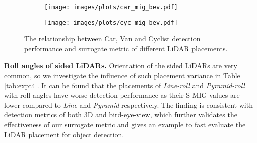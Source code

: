 \documentclass[10pt,twocolumn,letterpaper]{article}
\begin{document}
\begin{figure*}[t]
    \begin{subfigure}[b]{0.45\textwidth}
  \texttt{[image: images/plots/car\_mig\_bev.pdf]}
    \end{subfigure}%
    \begin{subfigure}[b]{0.45\textwidth}
  \texttt{[image: images/plots/cyc\_mig\_bev.pdf]}
    \end{subfigure}%
    \vspace*{-3mm}
  \caption{The relationship between Car, Van and Cyclist detection performance  and surrogate metric of different LiDAR placements.}
  \label{fig:expt2}
   \vspace*{-5mm}
\end{figure*}

\textbf{Roll angles of sided LiDARs.} Orientation of the sided LiDARs are very common, so we investigate the influence of such placement variance in Table \ref{tab:expt4}.  It can be found that the placements of \textit{Line-roll} and \textit{Pyramid-roll} with roll angles  have worse detection performance as their S-MIG values are lower compared to \textit{Line}  and  \textit{Pyramid} respectively. The finding is consistent with detection metrics of both 3D and bird-eye-view, which further validates the effectiveness of our surrogate  metric and gives an example to fast evaluate the LiDAR placement for object detection.
\end{document}
